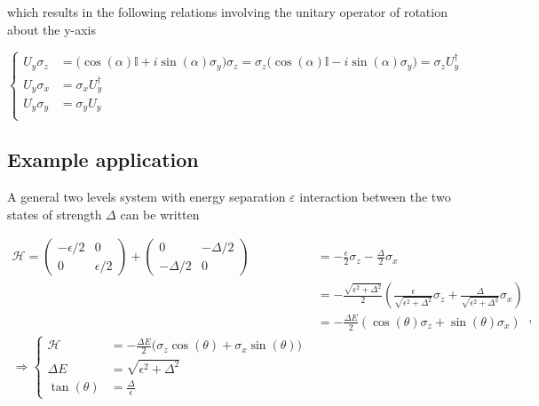  \noindent  which  results  in  the following  relations  involving  the
 unitary operator of rotation about the y-axis

 \begin{equation}\label{uniComm1}
   \left\lbrace\begin{aligned}
       U_{y}\sigma_z & = \bigg(\cos(\alpha)\mathbb{I}+i\sin(\alpha)\sigma_y\bigg)\sigma_z = \sigma_z\bigg(\cos(\alpha)\mathbb{I}-i\sin(\alpha)\sigma_y\bigg) = \sigma_zU_y^{\dagger}\\
       U_{y}\sigma_x & = \sigma_xU_y^{\dagger}\\
       U_{y}\sigma_y & = \sigma_yU_y\\
     \end{aligned}\right.
 \end{equation}

 \subsection{Example application\label{subsec:ExampleApplication}}
 A  general two  levels system  with energy  separation $  \varepsilon $
 interaction  between the  two  states of  strength $  \Delta  $ can  be
 written

 \begin{equation}
   \label{l1-uni}
   \begin{aligned}
     \mathcal{H} = \left(\begin{matrix} -\epsilon/2 & 0\\ 0 & \epsilon/2
       \end{matrix}\right) + \begin{pmatrix}
       0 & -\Delta/2\\-\Delta/2 & 0
     \end{pmatrix} & = {-\frac{\epsilon}{2}\sigma_z-\frac{\Delta}{2}\sigma_x}\\
     & = -\frac{\sqrt{\epsilon^2+\Delta^2}}{2}\left(\frac{\epsilon}{\sqrt{\epsilon^2+\Delta^2}}\sigma_z+\frac{\Delta}{\sqrt{\epsilon^2+\Delta^2}}\sigma_x\right)\\
     & = -\frac{\Delta E}{2}\left(\cos\left(\theta\right)\sigma_z+\sin\left(\theta\right)\sigma_x\right)\\
     {\Rightarrow \left\lbrace\begin{aligned}
           \mathcal{H} & = -\frac{\Delta E}{2}\big(\sigma_z\cos(\theta)+\sigma_x\sin(\theta)\big)\\
           \Delta E & = \sqrt{\epsilon^2+\Delta^2}\\
           \tan(\theta) & = \frac{\Delta}{\epsilon}
         \end{aligned}\right.}
   \end{aligned},
 \end{equation}

